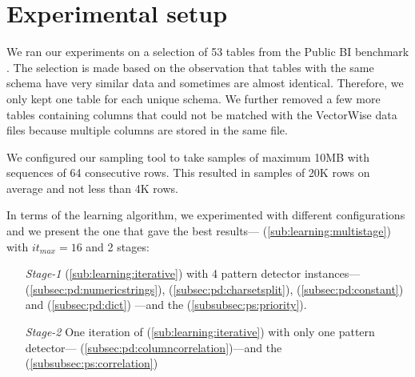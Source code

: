 \section{Experimental setup}
\label{sec:eval:expsetup}


\graphicspath{{6_evaluation/images/}}

% 

We ran our experiments on a selection of 53 tables from the Public BI benchmark \cite{pbib}. The selection is made based on the observation that tables with the same schema have very similar data and sometimes are almost identical. Therefore, we only kept one table for each unique schema. We further removed a few more tables containing columns that could not be matched with the VectorWise data files because multiple columns are stored in the same file.


We configured our sampling tool to take samples of maximum 10MB with sequences of 64 consecutive rows. This resulted in samples of 20K rows on average and not less than 4K rows.

In terms of the learning algorithm, we experimented with different configurations and we present the one that gave the best results--- (\ref{sub:learning:multistage}) with \(it_{max} = 16\) and 2 stages:
\begin{itemize}
    \item[\textit{Stage-1}]  (\ref{sub:learning:iterative}) with 4 pattern detector instances---
     (\ref{subsec:pd:numericstrings}), 
     (\ref{subsec:pd:charsetsplit}), 
     (\ref{subsec:pd:constant}) and 
     (\ref{subsec:pd:dict})
    ---and the  (\ref{subsubsec:ps:priority}).
    \item[\textit{Stage-2}] One iteration of  (\ref{sub:learning:iterative}) with only one pattern detector---     (\ref{subsec:pd:columncorrelation})---and the  (\ref{subsubsec:ps:correlation})
\end{itemize}

